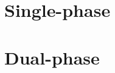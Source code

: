 \section{Single-phase}
\label{sec:tc-risks-sp}





\section{Dual-phase}
\label{sec:tc-risks-dp}



